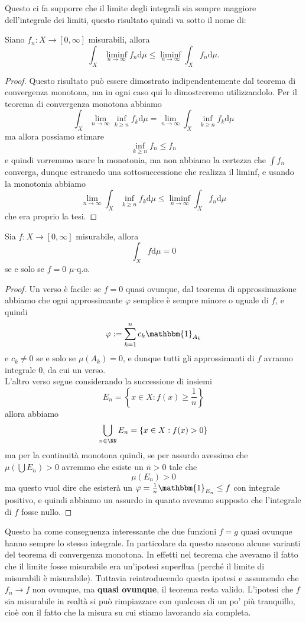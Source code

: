 \documentclass[11pt]{scrartcl}
\newcommand{\dif}{\text{d}}
\begin{document}
	Questo ci fa supporre che il limite degli integrali sia sempre maggiore dell'integrale dei limiti, questo risultato quindi va sotto il nome di:
	\begin{lemma}[Fatou]
		Siano $f_n:X\to [0,\infty]$ misurabili, allora
		$$\int_X\liminf_{n\to\infty}f_n\dif \mu \le \liminf_{n\to\infty}\int_X f_n\dif \mu.$$
	\end{lemma}
	\begin{proof}
		Questo risultato può essere dimostrato indipendentemente dal teorema di convergenza monotona, ma in ogni caso qui lo dimostreremo utilizzandolo. Per il teorema di convergenza monotona abbiamo
		$$\int_X\lim_{n\to\infty}\inf_{k\ge n}f_k\dif \mu=\lim_{n\to\infty}\int_X\inf_{k\ge n} f_k\dif \mu$$
		ma allora possiamo stimare 
		$$\inf_{k\ge n}f_n\le f_n$$
		e quindi vorremmo usare la monotonia, ma non abbiamo la certezza che $\int f_n$ converga, dunque estranedo una sottosuccessione che realizza il liminf, e usando la monotonia abbiamo
		$$\lim_{n\to\infty}\int_X\inf_{k\ge n} f_k\dif \mu\le \liminf_{n\to\infty}\int_X f_n\dif \mu$$
		che era proprio la tesi.
	\end{proof}
	
	\begin{proposition}
		Sia $f:X\to [0,\infty]$ misurabile, allora
		$$\int_Xf\dif \mu =0$$
		se e solo se $f=0$ $\mu$-q.o.
	\end{proposition}
	\begin{proof}
		Un verso è facile: se $f=0$ quasi ovunque, dal teorema di approssimazione abbiamo che ogni approssimante $\varphi$ semplice è sempre minore o uguale di $f$, e quindi
		$$\varphi:=\sum_{k=1}^{n}c_k \mathbbm{1}_{A_k}$$
		e $c_k\ne 0$ se e solo se $\mu(A_k)=0$, e dunque tutti gli approssimanti di $f$ avranno integrale $0$, da cui un verso. \\
		L'altro verso segue considerando la successione di insiemi
		$$E_n=\left\{x\in X:f(x)\ge \frac{1}{n}\right\}$$
		allora abbiamo
		$$\bigcup_{n\in\NN}E_n=\left\{x\in X:f(x)>0\right\}$$
		ma per la continuità monotona quindi, se per assurdo avessimo che $\mu\left(\bigcup E_n\right)>0$ avremmo che esiste un $\bar{n}>0$ tale che
		$$\mu\left(E_n\right)> 0$$
		ma questo vuol dire che esisterà un $\varphi=\frac{1}{n}\mathbbm{1}_{E_n}\le f$ con integrale positivo, e quindi abbiamo un assurdo in quanto avevamo supposto che l'integrale di $f$ fosse nullo.
	\end{proof}
	Questo ha come conseguenza interessante che due funzioni $f=g$ quasi ovunque hanno sempre lo stesso integrale. In particolare da questo nascono alcune varianti del teorema di convergenza monotona. In effetti nel teorema che avevamo il fatto che il limite fosse misurabile era un'ipotesi superflua (perché il limite di misurabili è misurabile). Tuttavia reintroducendo questa ipotesi e assumendo che $f_n\to f$ non ovunque, ma \textbf{quasi ovunque}, il teorema resta valido. L'ipotesi che $f$ sia misurabile in realtà si può rimpiazzare con qualcosa di un po' più tranquillo, cioè con il fatto che la misura su cui stiamo lavorando sia completa. 
\end{document}
